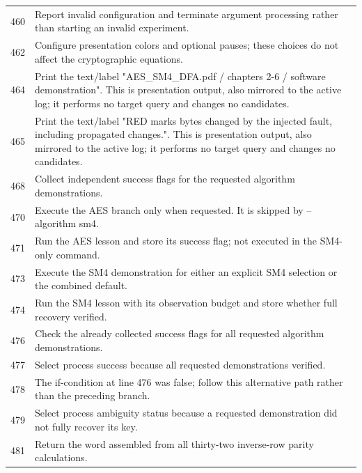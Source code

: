 \begin{longtable}{r >{\raggedright\arraybackslash}p{138mm}}
460&Report invalid configuration and terminate argument processing rather than starting an invalid experiment.\\
462&Configure presentation colors and optional pauses; these choices do not affect the cryptographic equations.\\
464&Print the text/label "AES\_SM4\_DFA.pdf / chapters 2-6 / software demonstration". This is presentation output, also mirrored to the active log; it performs no target query and changes no candidates.\\
465&Print the text/label "RED marks bytes changed by the injected fault, including propagated changes.". This is presentation output, also mirrored to the active log; it performs no target query and changes no candidates.\\
468&Collect independent success flags for the requested algorithm demonstrations.\\
470&Execute the AES branch only when requested. It is skipped by --algorithm sm4.\\
471&Run the AES lesson and store its success flag; not executed in the SM4-only command.\\
473&Execute the SM4 demonstration for either an explicit SM4 selection or the combined default.\\
474&Run the SM4 lesson with its observation budget and store whether full recovery verified.\\
476&Check the already collected success flags for all requested algorithm demonstrations.\\
477&Select process success because all requested demonstrations verified.\\
478&The if-condition at line 476 was false; follow this alternative path rather than the preceding branch.\\
479&Select process ambiguity status because a requested demonstration did not fully recover its key.\\
481&Return the word assembled from all thirty-two inverse-row parity calculations.\\
\bottomrule\end{longtable}\endgroup